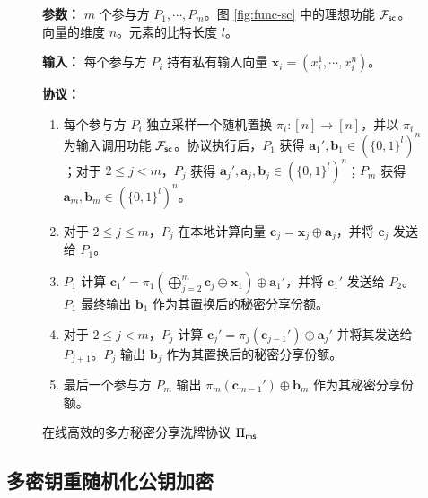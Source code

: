 \begin{figure}[!htb]
\begin{framed}
\begin{minipage}[c]{\textwidth}
\begin{trivlist}
\item \textbf{参数：} $m$ 个参与方 $P_1, \cdots, P_m$。图 \ref{fig:func-sc} 中的理想功能 $\mathcal{F}_\mathsf{sc}$。向量的维度 $n$。元素的比特长度 $l$。
\item \textbf{输入：} 每个参与方 $P_i$ 持有私有输入向量 $\textbf{x}_i = {(x_i^1, \cdots, x_i^n)}$。
\item \textbf{协议：}
\begin{enumerate} [itemsep=2pt,topsep=0pt,parsep=0pt]
\item 每个参与方 $P_i$ 独立采样一个随机置换 $\pi_i : [n] \to [n]$，并以 $\pi_i$ 为输入调用功能 $\mathcal{F}_\mathsf{sc}$。协议执行后，$P_1$ 获得 $\textbf{a}_1',\textbf{b}_1 \in (\{0,1\}^l)^n$；对于 $2 \le j < m$，$P_j$ 获得 $\textbf{a}_j',\textbf{a}_j,\textbf{b}_j \in (\{0,1\}^l)^n$；$P_m$ 获得 $\textbf{a}_m,\textbf{b}_m \in (\{0,1\}^l)^n$。
\item 对于 $2 \le j \le m$，$P_j$ 在本地计算向量 $\textbf{c}_j = \textbf{x}_j \oplus \textbf{a}_j$，并将 $\textbf{c}_j$ 发送给 $P_1$。
\item $P_1$ 计算 $\textbf{c}_1'=\pi_1 (\bigoplus_{j=2}^m \textbf{c}_j \oplus \textbf{x}_1) \oplus \textbf{a}_1'$，并将 $\textbf{c}_1'$ 发送给 $P_2$。$P_1$ 最终输出 $\textbf{b}_1$ 作为其置换后的秘密分享份额。
\item 对于 $2 \le j < m$，$P_j$ 计算 $\textbf{c}_j'=\pi_j (\textbf{c}_{j-1}') \oplus \textbf{a}_j'$ 并将其发送给 $P_{j+1}$。$P_j$ 输出 $\textbf{b}_j$ 作为其置换后的秘密分享份额。
\item 最后一个参与方 $P_m$ 输出 $\pi_m (\textbf{c}_{m-1}') \oplus \textbf{b}_m$ 作为其秘密分享份额。
\end{enumerate}
\end{trivlist}
\end{minipage}
\end{framed}
\caption{在线高效的多方秘密分享洗牌协议 $\Pi_\mathsf{ms}$}\label{fig:proto-ms}
\end{figure}

\subsection{多密钥重随机化公钥加密}\label{sec:mkr-pke}

